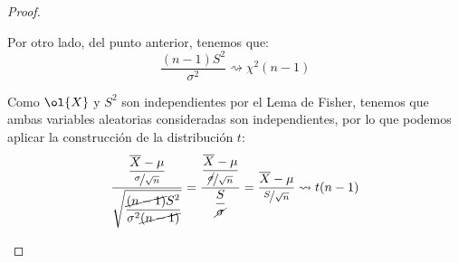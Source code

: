 \begin{coro}
\begin{proof}
\begin{enumerate}
            Por otro lado, del punto anterior, tenemos que:
            \begin{equation*}
                \dfrac{(n-1)S^2}{\sigma^2} \rightsquigarrow \chi^2(n-1)
            \end{equation*}

            Como $\ol{X}$ y $S^2$ son independientes por el Lema de Fisher, tenemos que ambas variables aleatorias consideradas son independientes, por lo que podemos aplicar la construcción de la distribución $t$:
            \begin{equation*}
                \dfrac{\dfrac{\overline{X}-\mu}{\nicefrac{\sigma}{\sqrt{n}}}}{\sqrt{\dfrac{\cancel{(n-1)}S^2}{\sigma^2\cancel{(n-1)}}}} = \dfrac{\dfrac{\overline{X}-\mu}{\nicefrac{\cancel{\sigma}}{\sqrt{n}}}}{\dfrac{S}{\cancel{\sigma}}} = \dfrac{\overline{X}-\mu}{\nicefrac{S}{\sqrt{n}}} \rightsquigarrow t(n-1)
            \end{equation*}\qedhere
    \end{enumerate}
\end{proof}
\end{coro}

